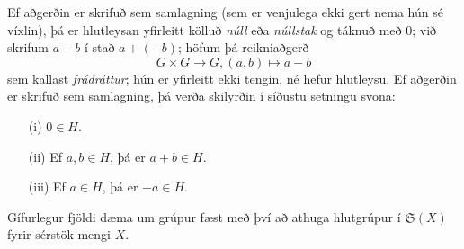 \documentclass[a4paper,icelandic,11pt]{book}
\theoremstyle{plain}
\begin{document}
Ef aðgerðin er skrifuð sem samlagning (sem er venjulega ekki gert nema hún sé
víxlin), þá er hlutleysan yfirleitt kölluð \emph{núll} eða
\emph{núllstak} og táknuð með $0$; við skrifum $a-b$ í stað
$a+(-b)$; höfum þá reikniaðgerð
\[ G\times G \to G, (a,b)\mapsto a-b \]
sem kallast \emph{frádráttur};
hún er yfirleitt ekki tengin, né hefur
hlutleysu. Ef aðgerðin er skrifuð sem samlagning, þá verða skilyrðin í
síðustu setningu svona:
\begin{itemize}
  \item [(i)] $0\in H$.
  \item [(ii)] Ef $a,b\in H$, þá er $a+b\in H$.
  \item [(iii)] Ef $a\in H$, þá er $-a\in H$.
\end{itemize}
Gífurlegur fjöldi dæma um grúpur fæst með því að athuga hlutgrúpur í
$\mathfrak S (X)$ fyrir sérstök mengi $X$.
\end{document}
